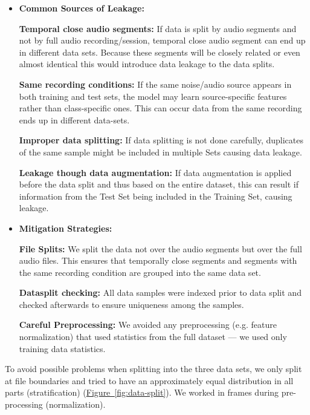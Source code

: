 \begin{itemize}
	\item {\bf Common Sources of Leakage: } 
    
		{\bf Temporal close audio segments: } If data is split by audio segments and not by full audio recording/session, temporal close audio segment can end up in different data sets. Because these segments will be closely related or even almost identical this would introduce data leakage to the data splits. 
        
		{\bf Same recording conditions: } If the same noise/audio source appears in both training and test sets, the model may learn source-specific features rather than class-specific ones. This can occur data from the same recording ends up in different data-sets. 

        {\bf Improper data splitting: } If data splitting is not done carefully, duplicates of the same sample might be included in multiple Sets causing data leakage.
        
        {\bf Leakage though data augmentation: } If data augmentation is applied before the data split and thus based on the entire dataset, this can result if information from the Test Set being included in the Training Set, causing leakage.\\
	
	\item {\bf Mitigation Strategies: } 
    
		{\bf File Splits:} We split the data not over the audio segments but over the full audio files. This ensures that temporally close segments and segments with the same recording condition are grouped into the same data set.

		{\bf Datasplit checking:} All data samples were indexed prior to data split and checked afterwards to ensure uniqueness among the samples. 
        
		{\bf Careful Preprocessing:} We avoided any preprocessing (e.g. feature normalization) that used statistics from the full dataset — we used only training data statistics. 
\end{itemize}


To avoid possible problems when splitting into the three data sets, 
we only split at file boundaries and tried to have an approximately equal distribution in all parts (stratification)  (\hyperref[fig:data-split]{Figure~\ref*{fig:data-split}}).
We worked in frames during pre-processing (normalization).




